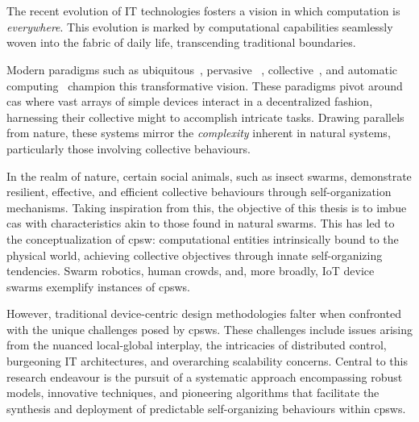 \chapter{\introductionname}\label{chap:introduction}
The recent evolution of IT technologies fosters a vision in which computation is \textit{everywhere}. 
 This evolution is marked by computational capabilities seamlessly woven into the fabric of daily life, 
 transcending traditional boundaries. 

Modern paradigms such as ubiquitous~\cite{DBLP:journals/sigmobile/Weiser99}, pervasive
 ~\cite{DBLP:journals/computer/SahaM03}, collective~\cite{DBLP:journals/computer/Abowd16}, 
 and automatic computing~\cite{DBLP:journals/computer/KephartC03} champion this transformative vision. 
%
These paradigms pivot around \ac{cas} where vast arrays of simple devices interact in a decentralized fashion, 
 harnessing their collective might to accomplish intricate tasks. 
%
Drawing parallels from nature, 
 these systems mirror the \textit{complexity} inherent in natural systems, particularly those involving collective behaviours.

In the realm of nature, certain social animals, such as insect swarms, 
 demonstrate resilient, effective, and efficient collective behaviours through self-organization mechanisms. 
 Taking inspiration from this, the objective of this thesis is to imbue \ac{cas} with characteristics akin to those found in natural swarms. 
%
This has led to the conceptualization of \ac{cpsw}: 
 computational entities intrinsically bound to the physical world, 
 achieving collective objectives through innate self-organizing tendencies. 
%
Swarm robotics, human crowds, and, more broadly, IoT device swarms exemplify instances of \acp{cpsw}.

However, traditional device-centric design methodologies falter when confronted with the unique challenges posed by \acp{cpsw}. 
 These challenges include issues arising from the nuanced local-global interplay, 
 the intricacies of distributed control, 
 burgeoning IT architectures, 
 and overarching scalability concerns. 
%
Central to this research endeavour is the pursuit of a systematic approach encompassing robust models, 
 innovative techniques, 
 and pioneering algorithms that facilitate the synthesis and deployment of predictable self-organizing behaviours within \acp{cpsw}.

